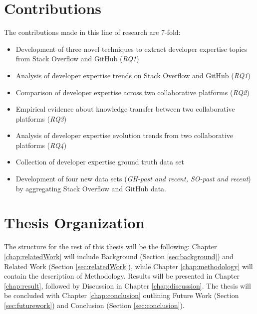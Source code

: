    \section{Contributions\label{sec:contribution}}
        The contributions made in this line of research are 7-fold:
        \begin{itemize}
            \item Development of three novel techniques to extract developer expertise topics from Stack Overflow and GitHub (\emph{RQ1})
            \item Analysis of developer expertise trends on Stack Overflow and GitHub (\emph{RQ1})
            \item Comparison of developer expertise across two collaborative platforms (\emph{RQ2})
            \item Empirical evidence about knowledge transfer between two collaborative platforms (\emph{RQ3})
            \item Analysis of developer expertise evolution trends from two collaborative platforms (\emph{RQ4})
            \item Collection of developer expertise ground truth data set
            \item Development of four new data sets (\emph{GH-past and recent, SO-past and recent}) by aggregating Stack Overflow and GitHub data.
        \end{itemize}
    
     \section{Thesis Organization\label{sec:thesis_structure}}
        The structure for the rest of this thesis will be the following: Chapter \ref{chap:relatedWork} will include Background (Section \ref{sec:background}) and Related Work (Section \ref{sec:relatedWork}), while Chapter \ref{chap:methodology} will contain the description of Methodology. Results will be presented in Chapter \ref{chap:result}, followed by Discussion in Chapter \ref{chap:discussion}. The thesis will be concluded with Chapter \ref{chap:conclusion} outlining Future Work (Section \ref{sec:futurework}) and Conclusion (Section \ref{sec:conclusion}).
        

